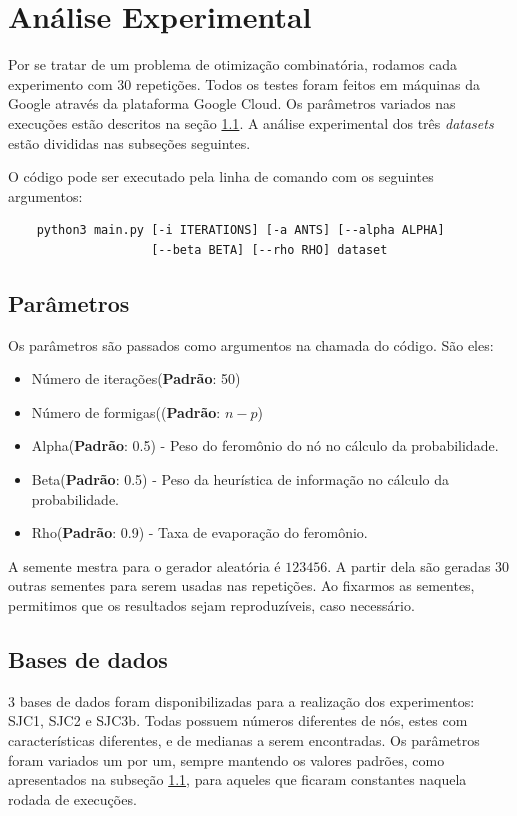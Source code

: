 \section{Análise Experimental}

Por se tratar de um problema de otimização combinatória, rodamos cada experimento com 30 repetições. Todos os testes foram feitos em máquinas da Google através da plataforma Google Cloud. Os parâmetros variados nas execuções estão descritos na seção \ref{xp_par}. A análise experimental dos três \textit{datasets} estão divididas nas subseções seguintes.

O código pode ser executado pela linha de comando com os seguintes argumentos:

\begin{center}
\begin{verbatim}
    python3 main.py [-i ITERATIONS] [-a ANTS] [--alpha ALPHA] 
                    [--beta BETA] [--rho RHO] dataset
\end{verbatim}
\end{center}

\subsection{Parâmetros} \label{xp_par}

Os parâmetros são passados como argumentos na chamada do código. São eles:

\begin{itemize}
	\item Número de iterações(\textbf{Padrão}: 50) 
    \item Número de formigas((\textbf{Padrão}: $n - p$)
    \item Alpha(\textbf{Padrão}: 0.5) - Peso do feromônio do nó no cálculo da probabilidade.
    \item Beta(\textbf{Padrão}: 0.5) - Peso da heurística de informação no cálculo da probabilidade.
    \item Rho(\textbf{Padrão}: 0.9) - Taxa de evaporação do feromônio.
\end{itemize}

A semente mestra para o gerador aleatória é $123456$. A partir dela são geradas 30 outras sementes para serem usadas nas repetições. Ao fixarmos as sementes, permitimos que os resultados sejam reproduzíveis, caso necessário.

\subsection{Bases de dados}
3 bases de dados foram disponibilizadas para a realização dos experimentos: SJC1, SJC2 e SJC3b. Todas possuem números diferentes de nós, estes com características diferentes, e de medianas a serem encontradas. Os parâmetros foram variados um por um, sempre mantendo os valores padrões, como apresentados na subseção \ref{xp_par}, para aqueles que ficaram constantes naquela rodada de execuções.

